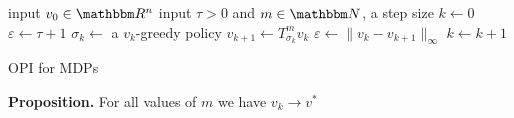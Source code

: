 \documentclass[xcolor=dvipsnames]{beamer}
\newcommand{\RR}{\mathbbm R}
\newcommand{\NN}{\mathbbm N}
\renewcommand{\epsilon}{\varepsilon}
\newcommand{\1}{\mathbbm 1}
\begin{document}
\begin{frame}
    
    {\small
    \begin{algorithm}[H]
        \DontPrintSemicolon
        \vspace{0.3em}
        input $v_0 \in \RR^n$\;
        \vspace{0.3em}
        input $\tau > 0$ and $m \in \NN$, a step size \;
        \vspace{0.3em}
        $k \leftarrow 0$ \;
        \vspace{0.3em}
        $\epsilon \leftarrow \tau + 1$ \;
        \vspace{0.3em}
        \While{$\epsilon > \tau $}
        {
            $\sigma_k \leftarrow $ a $v_k$-greedy policy \;
        \vspace{0.3em}
            $v_{k+1} \leftarrow T_{\sigma_k}^m v_k$  \;
        \vspace{0.3em}
            $\epsilon \leftarrow \| v_k - v_{k+1} \|_\infty$ \;
        \vspace{0.3em}
            $k \leftarrow k + 1$ \;
        }
        \vspace{0.3em}
        \caption{OPI for MDPs}
    \end{algorithm}
    }

\end{frame}


\begin{frame}

    \vspace{0.5em}
    \vspace{0.5em}
    \begin{block}{}
        {\bf Proposition.} For all values of $m$ we have $v_k \to v^*$
    \end{block}


\end{frame}
\end{document}
